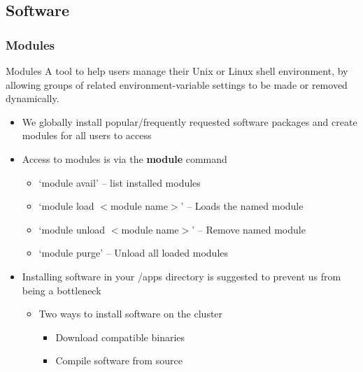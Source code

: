 \documentclass[t,hyperref={pdfpagelabels=false}]{beamer}
\newcommand{\ctilde}{{\fontfamily{ptm}\selectfont\texttildelow}}
\begin{document}
\subsection{Software}
\begin{frame}
	\frametitle{Modules}
	\begin{block}{Modules}\tiny
	A tool to help users manage their Unix or Linux shell environment, by allowing groups of related environment-variable settings to be made or removed dynamically.\footnotemark
	
	\end{block}
	\begin{itemize}
		\item We globally install popular/frequently requested software packages and create modules for all users to access
		\item Access to modules is via the \textbf{module} command
		\begin{itemize}\tiny
			\item `module avail' -- list installed modules
			\item `module load $<$module name$>$' -- Loads the named module
			\item `module unload $<$module name$>$' -- Remove named module
			\item `module purge' -- Unload all loaded modules
		\end{itemize}
		\item Installing software in your \ctilde{}/apps directory is suggested to prevent us from being a bottleneck
		\begin{itemize}\footnotesize
			\item Two ways to install software on the cluster
			\begin{itemize}\tiny
				\item Download compatible binaries
				\item Compile software from source
			\end{itemize}
		\end{itemize}
	\end{itemize}
\end{frame}
\end{document}
